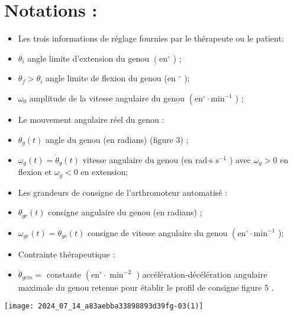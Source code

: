 \section*{Notations :}
\begin{itemize}
  \item Les trois informations de réglage fournies par le thérapeute ou le patient:

  \item $\theta_{i}$ angle limite d'extension du genou $\left(\mathrm{en}^{\circ}\right.$ ) ;

  \item $\theta_{f}>\theta_{i}$ angle limite de flexion du genou (en ${ }^{\circ}$ );

  \item $\omega_{0}$ amplitude de la vitesse angulaire du genou $\left(\mathrm{en}^{\circ} \cdot \mathrm{min}^{-1}\right.$ ) ;

  \item Le mouvement angulaire réel du genou :

  \item $\theta_{g}(t)$ angle du genou (en radians) (figure 3) ;

  \item $\omega_{g}(t)=\dot{\theta}_{g}(t)$ vitesse angulaire du genou (en rad$\cdot$s $\mathrm{s}^{-1}$ ) avec $\omega_{g}>0$ en flexion et $\omega_{g}<0$ en extension;

  \item Les grandeurs de consigne de l'arthromoteur automatisé :

  \item $\theta_{g c}(t)$ consigne angulaire du genou (en radians) ;

  \item $\omega_{g c}(t)=\dot{\theta}_{g c}(t)$ consigne de vitesse angulaire du genou $\left(\mathrm{en}^{\circ} \cdot \mathrm{min}^{-1}\right.$ );

  \item Contrainte thérapeutique :

  \item $\ddot{\theta}_{g c m}=$ constante $\left(\mathrm{en}^{\circ} \cdot \min ^{-2}\right.$ ) accélération-décélération angulaire maximale du genou retenue pour établir le profil de consigne figure 5 .

\end{itemize}

\begin{center}
\texttt{[image: 2024\_07\_14\_a83aebba33898893d39fg-03(1)]}
\end{center}

